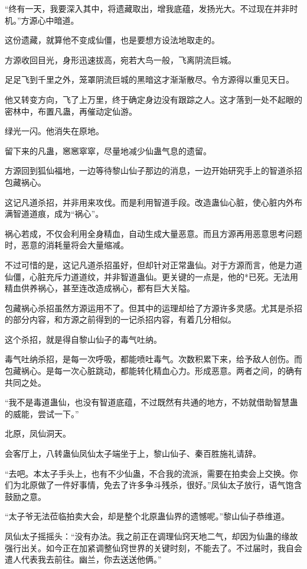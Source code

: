 \begin{this_body}
“终有一天，我要深入其中，将遗藏取出，增我底蕴，发扬光大。不过现在并非时机。”方源心中暗道。

这份遗藏，就算他不变成仙僵，也是要想方设法地取走的。

方源收回目光，身形迅速拔高，宛若大鸟一般，飞离阴流巨城。

足足飞到千里之外，笼罩阴流巨城的黑暗这才渐渐散尽。令方源得以重见天日。

他又转变方向，飞了上万里，终于确定身边没有跟踪之人。这才落到一处不起眼的密林中，布置凡蛊，再催动定仙游。

绿光一闪。他消失在原地。

留下来的凡蛊，窸窸窣窣，尽量地减少仙蛊气息的遗留。

方源回到狐仙福地，一边等待黎山仙子那边的消息，一边开始研究手上的智道杀招包藏祸心。

这记凡道杀招，并非用来攻伐。而是利用智道手段。改造蛊仙心脏，使心脏内外布满智道道痕，成为“祸心”。

祸心若成，不仅会利用全身精血，自动生成大量恶意。而且方源再用恶意思考问题时，恶意的消耗量将会大量缩减。

不过可惜的是，这记凡道杀招虽好，但却针对正常蛊仙。对于方源而言，他是力道仙僵，心脏充斥力道道纹，并非智道蛊仙。更关键的一点是，他的*已死。无法用精血供养祸心，甚至连改造成祸心，都有巨大关隘。

包藏祸心杀招虽然方源运用不了。但其中的运理却给了方源许多灵感。尤其是杀招的部分内容，和方源之前得到的一记杀招内容，有着几分相似。

这个杀招，就是得自黎山仙子的毒气吐纳。

毒气吐纳杀招，是每一次呼吸，都能喷吐毒气。次数积累下来，给予敌人创伤。而包藏祸心。是每一次心脏跳动，都能转化精血心力。形成恶意。两者之间，的确有共同之处。

“我不是毒道蛊仙，也没有智道底蕴，不过既然有共通的地方，不妨就借助智慧蛊的威能，尝试一下。”

北原，凤仙洞天。

会客厅上，八转蛊仙凤仙太子端坐于上，黎山仙子、秦百胜施礼请辞。

“去吧。本太子手头上，也有不少仙蛊，不合我的流派，需要在拍卖会上交换。你们为北原做了一件好事情，免去了许多争斗残杀，很好。”凤仙太子放行，语气饱含鼓励之意。

“太子爷无法莅临拍卖大会，却是整个北原蛊仙界的遗憾呢。”黎山仙子恭维道。

凤仙太子摇摇头：“没有办法。我之前正在调理仙窍天地二气，却因为仙蛊的缘故强行出关。如今正在加紧调整仙窍世界的关键时刻，不能去了。不过届时，我自会遣人代表我去前往。幽兰，你去送送他俩。”


\end{this_body}
